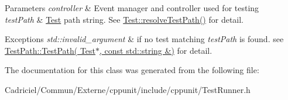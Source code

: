 \begin{DoxyParams}{Parameters}
{\em controller} & Event manager and controller used for testing \\
\hline
{\em test\+Path} & \hyperlink{class_test}{Test} path string. See \hyperlink{class_test_aaa1f5a8b47a9ad4feed4603c7e56758c}{Test\+::resolve\+Test\+Path()} for detail. \\
\hline
\end{DoxyParams}

\begin{DoxyExceptions}{Exceptions}
{\em std\+::invalid\+\_\+argument} & if no test matching {\itshape test\+Path} is found. see \hyperlink{class_test_path_a5855701e39a328a19f9780a130106cb3}{Test\+Path\+::\+Test\+Path( Test$\ast$, const std\+::string \&)} for detail. \\
\hline
\end{DoxyExceptions}


The documentation for this class was generated from the following file\+:\begin{DoxyCompactItemize}
\item 
Cadriciel/\+Commun/\+Externe/cppunit/include/cppunit/Test\+Runner.\+h\end{DoxyCompactItemize}
